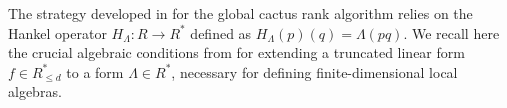 \documentclass[a4paper,11p]{amsart}
\begin{document}

The strategy developed in \cite{Alessandra} for the global cactus rank algorithm relies on the Hankel operator $H_\Lambda: R \to R^*$ defined as $H_\Lambda(p)(q)=\Lambda(pq)$. We recall here the crucial algebraic conditions from \cite{Bernard} for extending a truncated linear form $f\in R^*_{\leq d}$ to a form $\Lambda\in R^*$, necessary for defining finite-dimensional local algebras.
\end{document}
